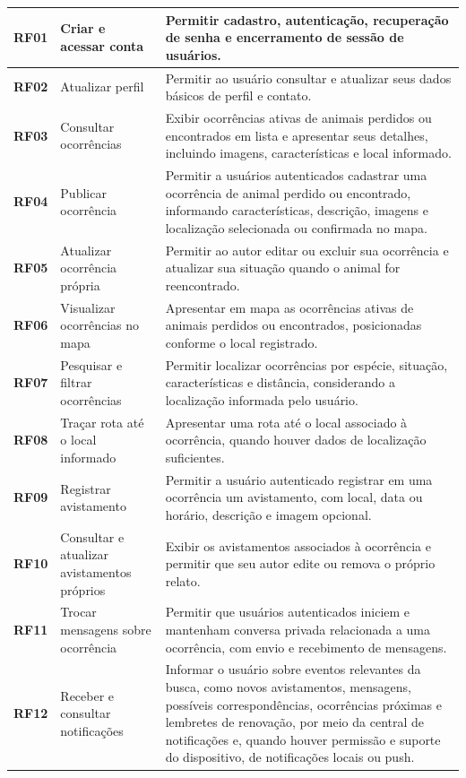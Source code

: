{\begin{longtable}{|>{\centering\arraybackslash}p{1.3cm}|>{\raggedright\arraybackslash}p{4.2cm}|>{\raggedright\arraybackslash}p{8.8cm}|}
\textbf{RF01} & Criar e acessar conta & Permitir cadastro, autenticação, recuperação de senha e encerramento de sessão de usuários. \\ \hline
\textbf{RF02} & Atualizar perfil & Permitir ao usuário consultar e atualizar seus dados básicos de perfil e contato. \\ \hline
\textbf{RF03} & Consultar ocorrências & Exibir ocorrências ativas de animais perdidos ou encontrados em lista e apresentar seus detalhes, incluindo imagens, características e local informado. \\ \hline
\textbf{RF04} & Publicar ocorrência & Permitir a usuários autenticados cadastrar uma ocorrência de animal perdido ou encontrado, informando características, descrição, imagens e localização selecionada ou confirmada no mapa. \\ \hline
\textbf{RF05} & Atualizar ocorrência própria & Permitir ao autor editar ou excluir sua ocorrência e atualizar sua situação quando o animal for reencontrado. \\ \hline
\textbf{RF06} & Visualizar ocorrências no mapa & Apresentar em mapa as ocorrências ativas de animais perdidos ou encontrados, posicionadas conforme o local registrado. \\ \hline
\textbf{RF07} & Pesquisar e filtrar ocorrências & Permitir localizar ocorrências por espécie, situação, características e distância, considerando a localização informada pelo usuário. \\ \hline
\textbf{RF08} & Traçar rota até o local informado & Apresentar uma rota até o local associado à ocorrência, quando houver dados de localização suficientes. \\ \hline
\textbf{RF09} & Registrar avistamento & Permitir a usuário autenticado registrar em uma ocorrência um avistamento, com local, data ou horário, descrição e imagem opcional. \\ \hline
\textbf{RF10} & Consultar e atualizar avistamentos próprios & Exibir os avistamentos associados à ocorrência e permitir que seu autor edite ou remova o próprio relato. \\ \hline
\textbf{RF11} & Trocar mensagens sobre ocorrência & Permitir que usuários autenticados iniciem e mantenham conversa privada relacionada a uma ocorrência, com envio e recebimento de mensagens. \\ \hline
\textbf{RF12} & Receber e consultar notificações & Informar o usuário sobre eventos relevantes da busca, como novos avistamentos, mensagens, possíveis correspondências, ocorrências próximas e lembretes de renovação, por meio da central de notificações e, quando houver permissão e suporte do dispositivo, de notificações locais ou push. \\ \hline

\end{longtable}}
